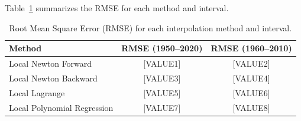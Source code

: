 Table~\ref{tab:rmse} summarizes the RMSE for each method and interval.

\begin{table}[htbp]
    \centering
    \begin{tabular}{lcc}
        \hline
        Method & RMSE (1950--2020) & RMSE (1960--2010) \\
        \hline
        Local Newton Forward & [VALUE1] & [VALUE2] \\
        Local Newton Backward & [VALUE3] & [VALUE4] \\
        Local Lagrange & [VALUE5] & [VALUE6] \\
        Local Polynomial Regression & [VALUE7] & [VALUE8] \\
        \hline
    \end{tabular}
    \caption{Root Mean Square Error (RMSE) for each interpolation method and interval.}
    \label{tab:rmse}
\end{table}